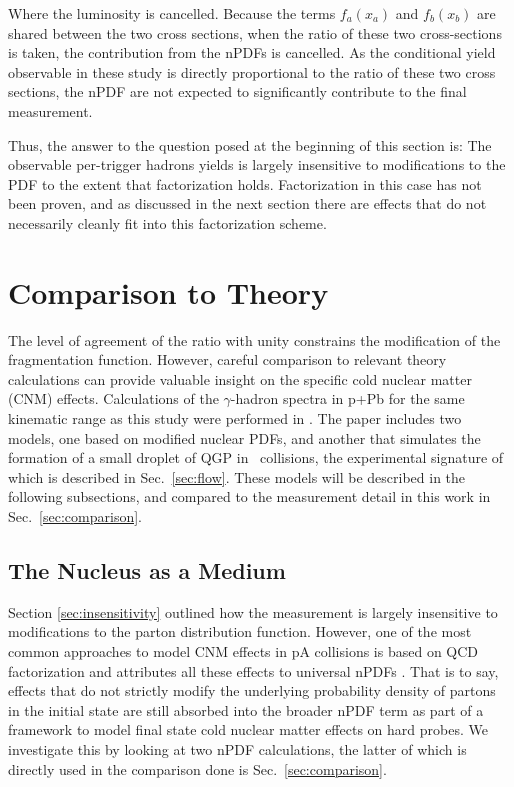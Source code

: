 Where the luminosity is cancelled. Because the terms $f_{a}(x_a)$ and $f_{b}(x_b)$ are shared between the two cross sections, when the ratio of these two cross-sections is taken, the contribution from the nPDFs is cancelled. As the conditional yield observable in these study is directly proportional to the ratio of these two cross sections, the nPDF are not expected to significantly contribute to the final measurement.

Thus, the answer to the question posed at the beginning of this section is: The observable per-trigger hadrons yields is largely insensitive to modifications to the PDF  to the extent that factorization holds. Factorization in this case has not been proven, and as discussed in the next section there are effects that do not necessarily cleanly fit into this factorization scheme.

\section{Comparison to Theory}
The  level of agreement of the ratio with unity constrains the modification of the fragmentation function. However, careful comparison to relevant theory calculations can provide valuable insight on the specific cold nuclear matter (CNM) effects. Calculations of the $\gamma$-hadron spectra in p+Pb for the same kinematic range as this study were performed in \cite{Xie2021}. The paper includes two models, one based on modified nuclear PDFs, and another that simulates the formation of a small droplet of QGP in \pPb~collisions, the experimental signature of which is described in Sec.~\ref{sec:flow}. These models will be described in the following subsections, and compared to the measurement detail in this work in Sec.~\ref{sec:comparison}.

\subsection{The Nucleus as a Medium}
\label{compare_cnm}

Section \ref{sec:insensitivity} outlined how the measurement is largely insensitive to modifications to the parton distribution function. However, one of the most common approaches to model CNM effects in pA collisions is based on QCD factorization and attributes all these effects to universal nPDFs \cite{Kang2012,Eskola2009a,Hirai2007}. That is to say, effects that do not strictly modify the underlying probability density of partons in the initial state are still absorbed into the broader nPDF term as part of a framework to model final state cold nuclear matter effects on hard probes. We investigate this by looking at two nPDF calculations, the latter of which is directly used in the comparison done is Sec.~\ref{sec:comparison}.
 
